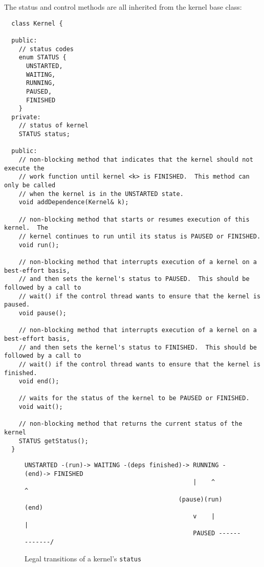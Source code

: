 
The status and control methods are all inherited from the kernel base class:

{\small
\begin{verbatim}
  class Kernel {

  public:      
    // status codes
    enum STATUS {
      UNSTARTED,
      WAITING,
      RUNNING,
      PAUSED,
      FINISHED
    }
  private:
    // status of kernel
    STATUS status;

  public:
    // non-blocking method that indicates that the kernel should not execute the
    // work function until kernel <k> is FINISHED.  This method can only be called
    // when the kernel is in the UNSTARTED state.
    void addDependence(Kernel& k);

    // non-blocking method that starts or resumes execution of this kernel.  The  
    // kernel continues to run until its status is PAUSED or FINISHED.
    void run();

    // non-blocking method that interrupts execution of a kernel on a best-effort basis,
    // and then sets the kernel's status to PAUSED.  This should be followed by a call to 
    // wait() if the control thread wants to ensure that the kernel is paused.
    void pause();

    // non-blocking method that interrupts execution of a kernel on a best-effort basis,
    // and then sets the kernel's status to FINISHED.  This should be followed by a call to 
    // wait() if the control thread wants to ensure that the kernel is finished.
    void end();

    // waits for the status of the kernel to be PAUSED or FINISHED.
    void wait();

    // non-blocking method that returns the current status of the kernel
    STATUS getStatus();
  }  
\end{verbatim}}


\begin{figure}[t]
\begin{center}
\begin{verbatim}
UNSTARTED -(run)-> WAITING -(deps finished)-> RUNNING -(end)-> FINISHED
                                              |    ^              ^
                                          (pause)(run)          (end)
                                              v    |              |
                                              PAUSED -------------/
\end{verbatim}
\end{center}
\caption{Legal transitions of a kernel's {\tt status}}
\end{figure}


